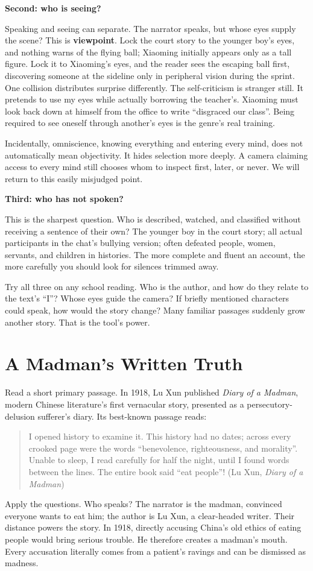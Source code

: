 \textbf{Second: who is seeing?}

Speaking and seeing can separate. The narrator speaks, but whose eyes supply the scene? This is \textbf{viewpoint}. Lock the court story to the younger boy's eyes, and nothing warns of the flying ball; Xiaoming initially appears only as a tall figure. Lock it to Xiaoming's eyes, and the reader sees the escaping ball first, discovering someone at the sideline only in peripheral vision during the sprint. One collision distributes surprise differently. The self-criticism is stranger still. It pretends to use my eyes while actually borrowing the teacher's. Xiaoming must look back down at himself from the office to write ``disgraced our class''. Being required to see oneself through another's eyes is the genre's real training.

Incidentally, omniscience, knowing everything and entering every mind, does not automatically mean objectivity. It hides selection more deeply. A camera claiming access to every mind still chooses whom to inspect first, later, or never. We will return to this easily misjudged point.

\textbf{Third: who has not spoken?}

This is the sharpest question. Who is described, watched, and classified without receiving a sentence of their own? The younger boy in the court story; all actual participants in the chat's bullying version; often defeated people, women, servants, and children in histories. The more complete and fluent an account, the more carefully you should look for silences trimmed away.

Try all three on any school reading. Who is the author, and how do they relate to the text's ``I''? Whose eyes guide the camera? If briefly mentioned characters could speak, how would the story change? Many familiar passages suddenly grow another story. That is the tool's power.

\section{A Madman's Written Truth}
Read a short primary passage. In 1918, Lu Xun published \emph{Diary of a Madman}, modern Chinese literature's first vernacular story, presented as a persecutory-delusion sufferer's diary. Its best-known passage reads:

\begin{quote}
I opened history to examine it. This history had no dates; across every crooked page were the words ``benevolence, righteousness, and morality''. Unable to sleep, I read carefully for half the night, until I found words between the lines. The entire book said ``eat people''! (Lu Xun, \emph{Diary of a Madman})
\end{quote}
Apply the questions. Who speaks? The narrator is the madman, convinced everyone wants to eat him; the author is Lu Xun, a clear-headed writer. Their distance powers the story. In 1918, directly accusing China's old ethics of eating people would bring serious trouble. He therefore creates a madman's mouth. Every accusation literally comes from a patient's ravings and can be dismissed as madness.

